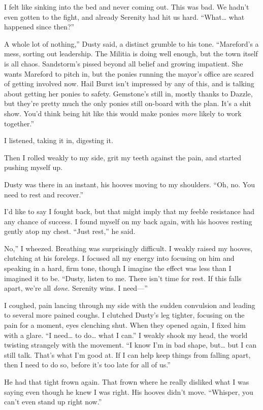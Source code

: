 I felt like sinking into the bed and never coming out. This was bad. We hadn’t even gotten to the fight, and already Serenity had hit us hard. “What… what happened since then?”

\leavevmode{}A whole lot of nothing,” Dusty said, a distinct grumble to his tone. “Mareford’s a mess, sorting out leadership. The Militia is doing well enough, but the town itself is all chaos. Sandstorm’s pissed beyond all belief and growing impatient. She wants Mareford to pitch in, but the ponies running the mayor’s office are scared of getting involved now. Hail Burst isn’t impressed by any of this, and is talking about getting her ponies to safety. Gemstone’s still in, mostly thanks to Dazzle, but they’re pretty much the only ponies still on-board with the plan. It’s a shit show. You’d think being hit like this would make ponies \textit{more} likely to work together.”

I listened, taking it in, digesting it.

Then I rolled weakly to my side, grit my teeth against the pain, and started pushing myself up.

Dusty was there in an instant, his hooves moving to my shoulders. “Oh, no. You need to rest and recover.”

I’d like to say I fought back, but that might imply that my feeble resistance had any chance of success. I found myself on my back again, with his hooves resting gently atop my chest. “Just rest,” he said.

\leavevmode{}No,” I wheezed. Breathing was surprisingly difficult. I weakly raised my hooves, clutching at his forelegs. I focused all my energy into focusing on him and speaking in a hard, firm tone, though I imagine the effect was less than I imagined it to be. “Dusty, listen to me. There isn’t time for rest. If this falls apart, we’re all \textit{done}. Serenity wins. I need—”

I coughed, pain lancing through my side with the sudden convulsion and leading to several more pained coughs. I clutched Dusty’s leg tighter, focusing on the pain for a moment, eyes clenching shut. When they opened again, I fixed him with a glare. “I need… to do… what I can.” I weakly shook my head, the world twisting strangely with the movement. “I know I’m in bad shape, but… but I can still talk. That’s what I’m good at. If I can help keep things from falling apart, then I need to do so, before it’s too late for all of us.”

He had that tight frown again. That frown where he really disliked what I was saying even though he knew I was right. His hooves didn’t move. “Whisper, you can’t even stand up right now.”

